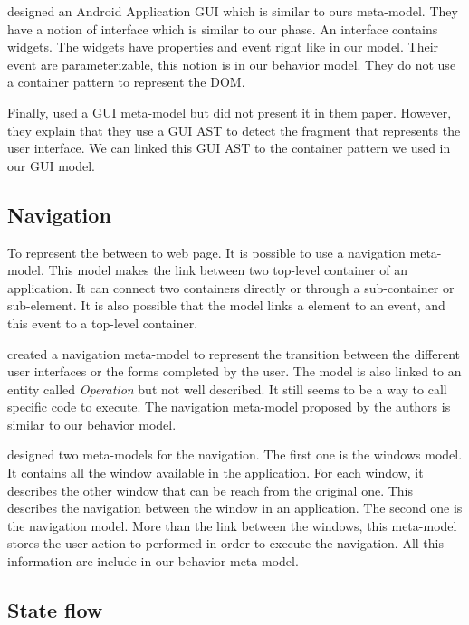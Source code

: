 \documentclass[conference]{IEEEtran}
\begin{document}
\citet{amalfitano2012using} designed an Android Application GUI which is similar to ours meta-model.
They have a notion of interface which is similar to our phase.
An interface contains widgets.
The widgets have properties and event right like in our model.
Their event are parameterizable, this notion is in our behavior model.
They do not use a container pattern to represent the DOM.

Finally, \citet{silva2010guisurfer} used a GUI meta-model but did not present it
    in them paper.
However, they explain that they use a GUI AST to detect the fragment that represents the user interface.
We can linked this GUI AST to the container pattern we used in our GUI model.

\subsection{Navigation}
\label{sec:navigation}

To represent the between to web page.
It is possible to use a navigation meta-model.
This model makes the link between two top-level container of
    an application.
It can connect two containers directly or through a sub-container or sub-element.
It is also possible that the model links a element to an event,
    and this event to a top-level container.

\citet{fleurey2007model} created a navigation meta-model to represent the
    transition between the different user interfaces or the forms completed by the user.
The model is also linked to an entity called \textit{Operation} but not well described.
It still seems to be a way to call specific code to execute.
The navigation meta-model proposed by the authors is similar to our behavior model.

\citet{morgado2011reverse} designed two meta-models for the navigation.
The first one is the windows model.
It contains all the window available in the application.
For each window, it describes the other window that can be reach from the original one.
This describes the navigation between the window in an application.
The second one is the navigation model.
More than the link between the windows,
    this meta-model stores the user action to performed in order to execute the navigation.
All this information are include in our behavior meta-model.

\subsection{State flow}
\label{sec:state}
\end{document}
